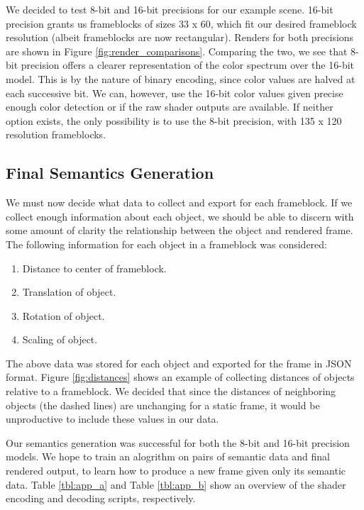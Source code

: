 \documentclass[conference]{IEEEtran}
\begin{document}
We decided to test 8-bit and 16-bit precisions for our example scene.
16-bit precision grants us frameblocks of sizes 33 x 60,
which fit our desired frameblock resolution (albeit frameblocks are now rectangular).
Renders for both precisions are shown in
Figure \ref{fig:render_comparisons}.
Comparing the two, we see that 8-bit precision offers a clearer representation
of the color spectrum over the 16-bit model.
This is by the nature of binary encoding,
since color values are halved at each successive bit.
We can, however, use the 16-bit color values
given precise enough color detection
or if the raw shader outputs are available.
If neither option exists, the only possibility is to use the 8-bit precision,
with 135 x 120 resolution frameblocks.

\subsection{Final Semantics Generation}
We must now decide what data to collect and export for each frameblock.
If we collect enough information about each object,
we should be able to discern with some amount of clarity
the relationship between the object and rendered frame.
The following information for each object in a frameblock was considered:
\bigskip
\begin{enumerate}
\item Distance to center of frameblock.
\item Translation of object.
\item Rotation of object.
\item Scaling of object.
\end{enumerate}
\bigskip

The above data was stored for each object and exported
for the frame in JSON format.
Figure \ref{fig:distances} shows an example of collecting
distances of objects relative to a frameblock.
We decided that since the distances of neighboring objects (the dashed lines)
are unchanging for a static frame, it would be unproductive to include these values
in our data.

Our semantics generation was successful for both the 8-bit and 16-bit precision models.
We hope to train an alogrithm on pairs of semantic data and final rendered output,
to learn how to produce a new frame given only its semantic data.
Table \ref{tbl:app_a} and Table \ref{tbl:app_b} show an overview of
the shader encoding and decoding scripts, respectively.
\end{document}
